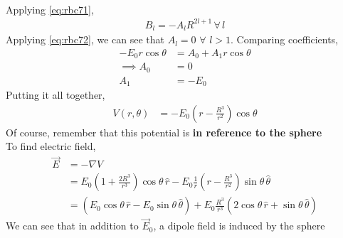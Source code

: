 \documentclass[../main.tex]{subfiles}
\begin{document}
\begin{questions}
\begin{solution}
\begin{align}
		\end{align}
		Applying \eqref{eq:rbc71},
		\begin{align}
			B_l = -A_l R^{2l+1} \,\forall\,l
		\end{align}
		Applying \eqref{eq:rbc72}, we can see that $A_l = 0$ $\forall$ $l > 1$. Comparing coefficients,
		\begin{align}
			-E_0r\cos\theta &= A_0 + A_1r\cos\theta\\
			\implies A_0 &= 0\\
			A_1 &= -E_0
		\end{align}
		Putting it all together,
		\begin{align}
			V(r,\theta) &= -E_0\left(r-\frac{R^3}{r^2}\right)\cos\theta
		\end{align}
		Of course, remember that this potential is \textbf{in reference to the sphere}\\ 
		To find electric field,
		\begin{align}
			\vec{E} &= -\nabla V\\
			&= E_0\left(1+\frac{2R^3}{r^3}\right)\cos\theta\,\hat{r} - E_0\frac{1}{r}\left(r-\frac{R^3}{r^2}\right)\sin\theta\,\hat{\theta}\\
			&= \left(E_0\cos\theta\,\hat{r} - E_0\sin\theta\,\hat{\theta}\right) + E_0\frac{R^3}{r^3}\left(2\cos\theta\,\hat{r} + \sin\theta\,\hat{\theta} \right)
		\end{align}
		We can see that in addition to $\vec{E}_0$, a dipole field is induced by the sphere
	\end{solution}


\end{questions}
\end{document}
